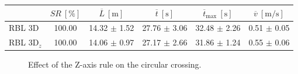 \begin{itemize}
\begin{table}[H]
                    \begin{tabular}{|l|c|c|c|c|c|}
                    \hline
                                                & \( SR \ [\%] \) & \( \overline{L} \ [\mathrm{m}] \) & \( \overline{t} \ [\mathrm{s}] \) & \( \overline{t}_{\text{max}} \ [\mathrm{s}] \) & \( \overline{v} \ [\mathrm{m/s}] \)     \\ \hline
                    RBL \ac{3D}                      & 100.00          & 14.32 $\pm$ 1.52                  & 27.76 $\pm$ 3.06                  & 32.48 $\pm$ 2.26                               & 0.51 $\pm$ 0.05                         \\ \hline
                    RBL \ac{3D}\(_z\)                & 100.00          & 14.06 $\pm$ 0.97                  & 27.17 $\pm$ 2.66                  & 31.86 $\pm$ 1.24                               & 0.55 $\pm$ 0.06                         \\ \hline
                    \end{tabular}
                \end{table}
        \end{itemize}

        \begin{figure}[H]
            \centering
            \caption{
                Effect of the Z-axis rule on the circular crossing. 
            }
            \label{}
        \end{figure}


